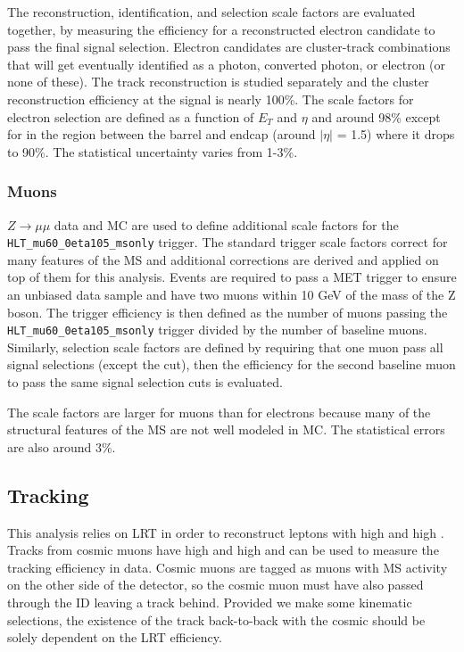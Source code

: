 The reconstruction, identification, and selection scale factors are evaluated together, by measuring the efficiency for a reconstructed electron candidate to pass the final signal selection. Electron candidates are cluster-track combinations that will get eventually identified as a photon, converted photon, or electron (or none of these). The track reconstruction is studied separately and the cluster reconstruction efficiency at the signal \pt is nearly 100\%. The scale factors for electron selection are defined as a function of $E_{T}$ and $\eta$ and around 98\% except for in the region between the barrel and endcap (around $|\eta|$ = 1.5) where it drops to 90\%. The statistical uncertainty varies from 1-3\%. 


\subsubsection{Muons}
$Z\rightarrow \mu\mu$ data and \ac{MC} are used to define additional scale factors for the \texttt{HLT\_mu60\_0eta105\_msonly} trigger. The standard trigger scale factors correct for many features of the \ac{MS} and additional corrections are derived and applied on top of them for this analysis. Events are required to pass a \ac{MET} trigger to ensure an unbiased data sample and have two muons within 10 GeV of the mass of the Z boson. The trigger efficiency is then defined as the number of muons passing the \texttt{HLT\_mu60\_0eta105\_msonly} trigger divided by the number of baseline muons. Similarly, selection scale factors are defined by requiring that one muon pass all signal selections (except the \absdz cut), then the efficiency for the second baseline muon to pass the same signal selection cuts is evaluated.

The scale factors are larger for muons than for electrons because many of the structural features of the \ac{MS} are not well modeled in \ac{MC}. The statistical errors are also around 3\%.


\subsection{Tracking}

This analysis relies on \ac{LRT} in order to reconstruct leptons with high \pt and high \absdz. 
Tracks from cosmic muons have high \pt and high \absdz and can be used to measure the tracking efficiency in data. Cosmic muons are tagged as muons with \ac{MS} activity on the other side of the detector, so the cosmic muon must have also passed through the \ac{ID} leaving a track behind. Provided we make some kinematic selections, the existence of the track back-to-back with the cosmic should be solely dependent on the \ac{LRT} efficiency.

